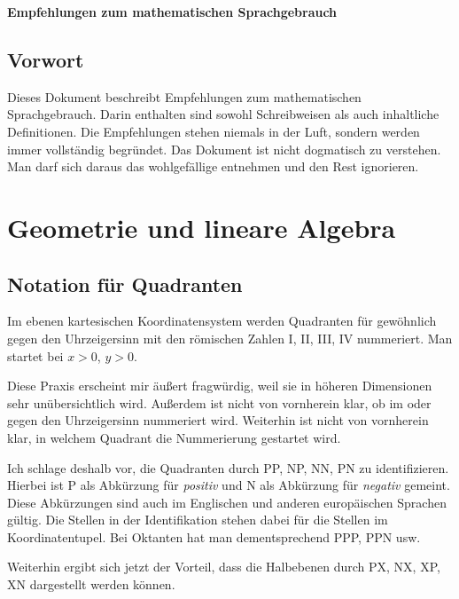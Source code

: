 \documentclass[a4paper,11pt,fleqn,twoside,BCOR=16mm]{scrartcl}
\begin{document}
\thispagestyle{empty}

\begin{huge}
\noindent
\textsf{\textbf{Empfehlungen zum mathematischen\newline
Sprachgebrauch}}
\par
\end{huge}

\tableofcontents

\subsection*{Vorwort}
Dieses Dokument beschreibt Empfehlungen zum mathematischen
Sprachgebrauch. Darin enthalten sind sowohl Schreibweisen als
auch inhaltliche Definitionen. Die Empfehlungen stehen niemals
in der Luft, sondern werden immer vollständig begründet.
Das Dokument ist nicht dogmatisch zu verstehen. Man darf sich
daraus das wohlgefällige entnehmen und den Rest ignorieren.

\newpage
\section{Geometrie und lineare Algebra}
\subsection{Notation für Quadranten}
Im ebenen kartesischen Koordinatensystem werden Quadranten für
gewöhnlich gegen den Uhrzeigersinn mit den römischen Zahlen
I, II, III, IV nummeriert. Man startet bei $x>0$, $y>0$.

Diese Praxis erscheint mir äußert fragwürdig, weil sie in höheren
Dimensionen sehr unübersichtlich wird. Außerdem ist nicht von
vornherein klar, ob im oder gegen den Uhrzeigersinn nummeriert wird.
Weiterhin ist nicht von vornherein klar, in welchem Quadrant
die Nummerierung gestartet wird.

Ich schlage deshalb vor, die Quadranten durch PP, NP, NN, PN
zu identifizieren. Hierbei ist P als Abkürzung für \emph{positiv}
und N als Abkürzung für \emph{negativ} gemeint. Diese Abkürzungen sind
auch im Englischen und anderen europäischen Sprachen gültig.
Die Stellen in der Identifikation stehen dabei für die Stellen
im Koordinatentupel. Bei Oktanten hat man dementsprechend PPP, PPN
usw.

Weiterhin ergibt sich jetzt der Vorteil, dass die Halbebenen durch
PX, NX, XP, XN dargestellt werden können.
\end{document}
